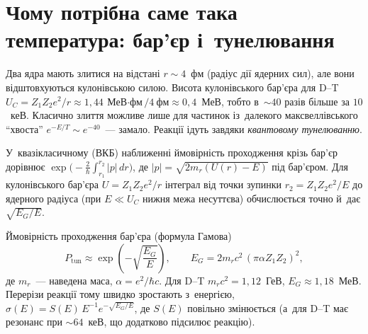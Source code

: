 \section{Чому потрібна саме така температура: бар'єр і~тунелювання}\label{sec:gamow}

Два ядра мають злитися на відстані $r\sim4$~фм (радіус дії ядерних сил), але вони відштовхуються
кулонівською силою. Висота кулонівського бар'єра для D--T
$U_C=Z_1Z_2e^2/r\approx1{,}44~\text{МеВ$\cdot$фм}/4~\text{фм}\approx0{,}4$~МеВ, тобто в~$\sim40$ разів
більше за $10$~кеВ. Класично злиття можливе лише для частинок із~далекого максвеллівського
\enquote{хвоста} $e^{-E/T}\sim e^{-40}$~--- замало. Реакції ідуть завдяки
\emph{квантовому тунелюванню}.

\begin{Theory}
У~квазікласичному (ВКБ) наближенні ймовірність проходження крізь бар'єр дорівнює
$\exp\bigl(-\tfrac2\hbar\int_{r_1}^{r_2}|p|\,dr\bigr)$, де $|p|=\sqrt{2m_r(U(r)-E)}$ під бар'єром.
Для кулонівського бар'єра $U=Z_1Z_2e^2/r$ інтеграл від точки зупинки $r_2=Z_1Z_2e^2/E$ до ядерного
радіуса (при $E\ll U_C$ нижня межа несуттєва) обчислюється точно й~дає $\sqrt{E_G/E}$.
\end{Theory}

Ймовірність проходження бар'єра (формула Гамова)
\begin{equation}\label{eq:gamow}
	P_{\mathrm{tun}}\approx\exp\!\left(-\sqrt{\frac{E_G}{E}}\right),\qquad
	E_G=2m_rc^2\,(\pi\alpha Z_1Z_2)^2,
\end{equation}
де $m_r$~--- наведена маса, $\alpha=e^2/\hbar c$. Для D--T $m_rc^2=1{,}12$~ГеВ, $E_G\approx1{,}18$~МеВ.
Перерізи реакції тому швидко зростають з~енергією, $\sigma(E)=S(E)\,E^{-1}e^{-\sqrt{E_G/E}}$,
де $S(E)$ повільно змінюється (а~для D--T має резонанс при $\sim64$~кеВ, що додатково підсилює реакцію).

